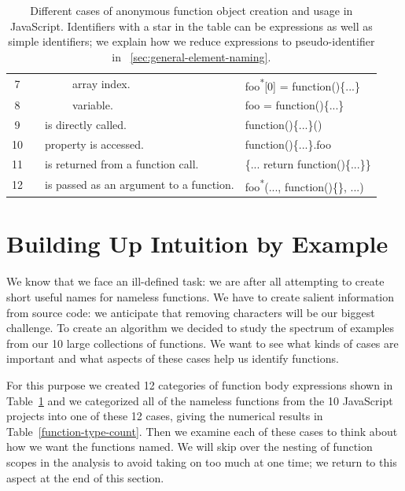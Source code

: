 \documentclass[10pt, preprint]{sigplanconf}
\begin{document}
\begin{table}[htp]
{\begin{tabular}{ | c | l | l | l | m{2.5cm} | l|}
   7 &
   &
   & \multicolumn{2}{|l|}{
      array index.}
   & foo\textsuperscript{*}[0] = function()\{...\} \\
   \cline{0-0}\cline{4-6} 

   8 &
   & 
   & \multicolumn{2}{|l|}{
      variable.}
   & foo = function()\{...\} \\
   \cline{0-0}\cline{3-6} 
   
   9 &
   & \multicolumn{3}{|m{3.8cm}|}{
     \raggedright is directly called.}
   & function()\{...\}() \\
   \cline{0-0}\cline{3-6} 

   10 &
   & \multicolumn{3}{|m{3.8cm}|}{
     \raggedright property is accessed.}
   & function()\{...\}.foo \\
   \cline{0-0}\cline{3-6} 

   11 &
   & \multicolumn{3}{|m{3.5cm}|}{
     \raggedright is returned from a function call.}
   & \{... return function()\{...\}\} \\
   \cline{0-0}\cline{3-6} 

   12 &
   & \multicolumn{3}{|m{3.5cm}|}{
     \raggedright is passed as an argument to a function.}
   & foo\textsuperscript{*}(..., function()\{\}, ...) \\
   \hline 

  \end{tabular}
    }
\caption{Different cases of anonymous function object creation and usage in JavaScript.  Identifiers with a star in the table can be expressions as well as simple identifiers; we explain how we reduce expressions to pseudo-identifier in ~\ref{sec:general-element-naming}.}
\label{table:function-types} 
\end{table}

\section{Building Up Intuition by Example}
\label{sec:intuition}
We know that we face an ill-defined task: we are after all attempting to create short useful names for nameless functions. We have to create salient information from source code: we anticipate that removing characters will be our biggest challenge.  To create an algorithm we decided to study the spectrum of examples from our 10 large collections of functions. We want to see what kinds of cases are important and what aspects of these cases help us identify functions.

For this purpose we created 12 categories of function body expressions shown in Table~\ref{table:function-types} and we categorized all of the nameless functions from the 10 JavaScript projects into one of these 12 cases, giving the numerical results in Table~\ref{function-type-count}.  Then we examine each of these cases to think about how we want the functions named. We will skip over the nesting of function scopes in the analysis to avoid taking on too much at one time; we return to this aspect at the end of this section.
 
\end{document}
